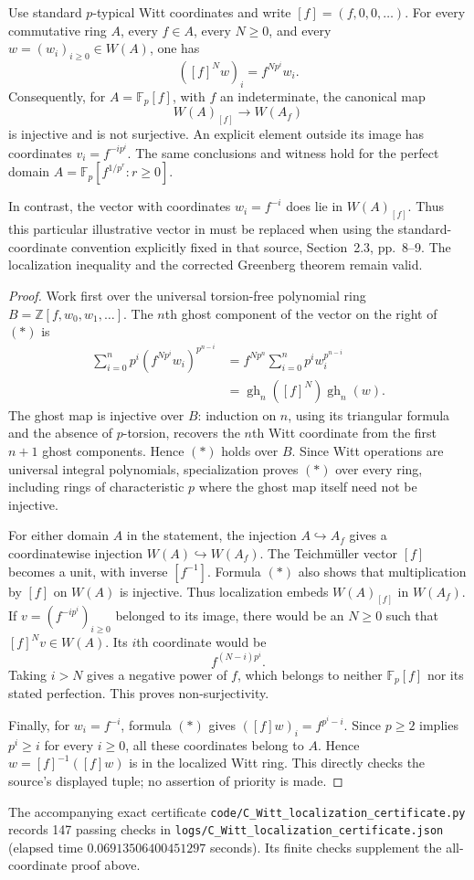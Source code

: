 \begin{lemma}\label{B:Witt-localization-witness}
Use standard $p$-typical Witt coordinates and write $[f]=(f,0,0,\ldots)$.
For every commutative ring $A$, every $f\in A$, every $N\geq0$, and every
$w=(w_i)_{i\geq0}\in W(A)$, one has
\[
 ([f]^Nw)_i=f^{Np^i}w_i.                                      \tag{\(*\)}
\]
Consequently, for $A=\mathbb F_p[f]$, with $f$ an indeterminate, the
canonical map
\[
 W(A)_{[f]}\longrightarrow W(A_f)
\]
is injective and is not surjective.  An explicit element outside its
image has coordinates $v_i=f^{-ip^i}$.  The same conclusions and witness
hold for the perfect domain
$A=\mathbb F_p[f^{1/p^r}:r\geq0]$.

In contrast, the vector with coordinates $w_i=f^{-i}$ does lie in
$W(A)_{[f]}$.  Thus this particular illustrative vector in
\cite[Remark~18.3]{BBertapelleGonzalezAviles2022} must be replaced when
using the standard-coordinate convention explicitly fixed in that
source, Section~2.3, pp.~8--9.  The localization inequality and the
corrected Greenberg theorem remain valid.
\end{lemma}

\begin{proof}
Work first over the universal torsion-free polynomial ring
$B=\mathbb Z[f,w_0,w_1,\ldots]$.  The $n$th ghost component of the
vector on the right of $(*)$ is
\begin{align*}
 \sum_{i=0}^n p^i(f^{Np^i}w_i)^{p^{n-i}}
 &=f^{Np^n}\sum_{i=0}^n p^i w_i^{p^{n-i}}\\
 &=\operatorname{gh}_n([f]^N)\operatorname{gh}_n(w).
\end{align*}
The ghost map is injective over $B$: induction on $n$, using its
triangular formula and the absence of $p$-torsion, recovers the $n$th
Witt coordinate from the first $n+1$ ghost components.  Hence $(*)$
holds over $B$.  Since Witt operations are universal integral
polynomials, specialization proves $(*)$ over every ring, including
rings of characteristic $p$ where the ghost map itself need not be
injective.

For either domain $A$ in the statement, the injection $A\hookrightarrow
A_f$ gives a coordinatewise injection $W(A)\hookrightarrow W(A_f)$.
The Teichm\"uller vector $[f]$ becomes a unit, with inverse $[f^{-1}]$.
Formula $(*)$ also shows that multiplication by $[f]$ on $W(A)$ is
injective.  Thus localization embeds $W(A)_{[f]}$ in $W(A_f)$.
If $v=(f^{-ip^i})_{i\geq0}$ belonged to its image, there would be an
$N\geq0$ such that $[f]^Nv\in W(A)$.  Its $i$th coordinate would be
\[
 f^{(N-i)p^i}.
\]
Taking $i>N$ gives a negative power of $f$, which belongs to neither
$\mathbb F_p[f]$ nor its stated perfection.  This proves non-surjectivity.

Finally, for $w_i=f^{-i}$, formula $(*)$ gives
$([f]w)_i=f^{p^i-i}$.  Since $p\geq2$ implies $p^i\geq i$ for every
$i\geq0$, all these coordinates belong to $A$.  Hence
$w=[f]^{-1}([f]w)$ is in the localized Witt ring.  This directly checks
the source's displayed tuple; no assertion of priority is made.
\end{proof}

The accompanying exact certificate
\texttt{code/C\_Witt\_localization\_certificate.py} records 147 passing
checks in \texttt{logs/C\_Witt\_localization\_certificate.json}
(elapsed time $0.06913506400451297$ seconds).  Its finite checks
supplement the all-coordinate proof above.
